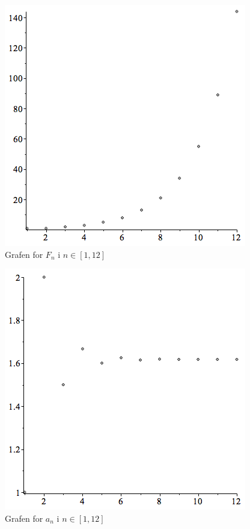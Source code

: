 \documentclass[11pt,a4paper]{article}
\begin{document}
\begin{multicols}{2}
    \begin{figure}[H]
        \includegraphics[scale=0.5]{figures/2-3b-fig-1.png}
        \caption{Grafen for $F_n$ i $n \in [1,12]$}
        \label{fig:2.3b-1}
    \end{figure}
    \vfill\columnbreak
    \begin{figure}[H]
        \includegraphics[scale=0.5]{figures/2-3b-fig-2.png}
        \caption{Grafen for $a_n$ i $n \in [1,12]$}
        \label{fig:2.3b-2}
    \end{figure}
\end{multicols}
\end{document}
